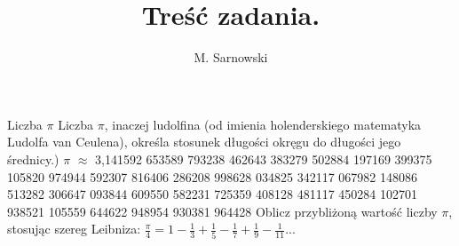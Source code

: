 \documentclass[a4paper,11pt]{article}
\author{M. Sarnowski}
\title{Treść zadania.}
\begin{document}
\maketitle
Liczba $\pi$
Liczba $\pi$, inaczej ludolfina (od imienia holenderskiego matematyka Ludolfa van Ceulena), określa stosunek długości okręgu do długości jego średnicy.)
\newline
\newline
$\pi$ $\approx$ 3,141592 653589 793238 462643 383279 502884 197169 399375 105820 974944 592307 816406 286208 998628 034825 342117 067982 148086 513282 306647 093844 609550 582231 725359 408128 481117 450284 102701 938521 105559 644622 948954 930381 964428
\newline
\newline
Oblicz przybliżoną wartość liczby $\pi$, stosując szereg Leibniza:
\newline
\newline
$\frac{\pi}{4} = 1 - \frac{1}{3} + \frac{1}{5} - \frac{1}{7} + \frac{1}{9} -\frac{1}{11}... $
\newline
\end{document}
